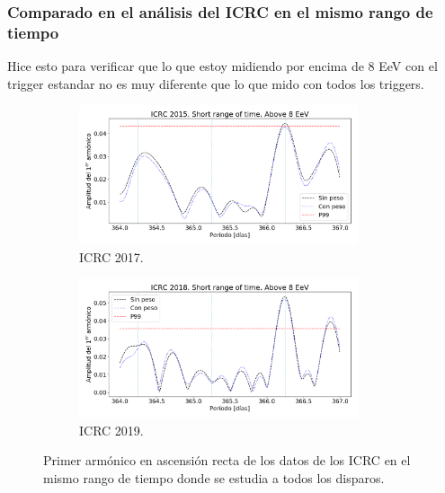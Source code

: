       \subsubsection{Comparado en el análisis del ICRC en el mismo rango de tiempo}
        Hice esto para verificar que  lo que estoy midiendo por encima de 8 EeV con el trigger estandar no es muy diferente que lo que mido con todos los triggers.

        \begin{figure}[H]
          \begin{subfigure}[b]{0.5\textwidth}
          \centering
            \includegraphics[width=0.9\textwidth]{../0_Introduccion/ICRC/ICRC_2017_Short_time_Above_8_EeV.png}
            \caption{ICRC 2017.}  \label{fig:8EeV_short_range_ICRC2017}
          \end{subfigure}%
          \begin{subfigure}[b]{0.5\textwidth}
          \centering
            \includegraphics[width=0.9\textwidth]{../0_Introduccion/ICRC/ICRC_2019_Short_time_Above_8_EeV.png}
            \caption{ICRC 2019.}  \label{fig:8EeV_short_range_ICRC2019}
          \end{subfigure}
          \caption{Primer armónico en ascensión recta de los datos de los ICRC en el mismo rango de tiempo donde se estudia a todos los disparos.}
        \end{figure}



